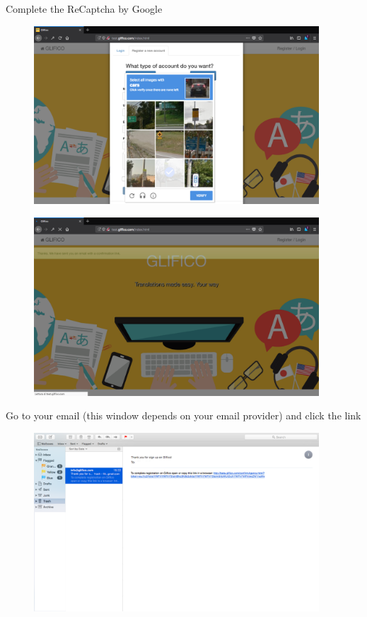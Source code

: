 \documentclass[11 pt, a4paper]{article}
\begin{document}
\clearpage
Complete the ReCaptcha by Google
\begin{figure}[H]
\centering
\includegraphics[width=0.95\textwidth]{register_translator4.png}
\end{figure}

\begin{figure}[H]
\centering
\includegraphics[width=0.95\textwidth]{register_translator5.png}
\end{figure}

\clearpage
Go to your email (this window depends on your email provider) and click the link
\begin{figure}[H]
\centering
\includegraphics[width=0.95\textwidth]{register_translator6.png}
\end{figure}
\end{document}
